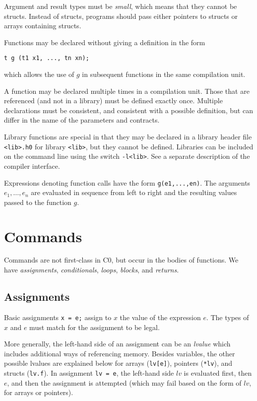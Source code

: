 \documentclass[11pt]{article}
\begin{document}
Argument and result types must be \emph{small}, which means that
they cannot be structs.  Instead of structs, programs should
pass either pointers to structs or arrays containing structs.

Functions may be declared without giving a definition in the form
\begin{lstlisting}
t g (t1 x1, ..., tn xn);
\end{lstlisting}
which allows the use of $g$ in subsequent functions in the same
compilation unit.

A function may be declared multiple times in a compilation unit.
Those that are referenced (and not in a library) must be defined
exactly once.  Multiple declarations must be consistent, and
consistent with a possible definition, but can differ in the name of
the parameters and contracts.

Library functions are special in that they may be declared in
a library header file \lstinline'<lib>.h0' for library \lstinline'<lib>', but
they cannot be defined.  Libraries can be included on the
command line using the switch \lstinline'-l<lib>'.  See a separate
description of the compiler interface.

Expressions denoting function calls have the form \lstinline'g(e1,...,en)'.
The arguments $e_1, \ldots, e_n$ are evaluated in sequence from
left to right and the resulting values passed to the function $g$.

\section{Commands}

Commands are not first-class in C0, but occur in the bodies
of functions.  We have \emph{assignments}, \emph{conditionals},
\emph{loops}, \emph{blocks}, and \emph{returns}.

\subsection{Assignments}

Basic assignments \lstinline'x = e;' assign to $x$ the value
of the expression $e$.  The types of $x$ and $e$ must match
for the assignment to be legal.

More generally, the left-hand side of an assignment can be an
\emph{lvalue} which includes additional ways of referencing memory.
Besides variables, the other possible lvalues are explained below for
arrays (\lstinline'lv[e]'), pointers (\lstinline'*lv'), and structs
(\lstinline'lv.f').  In assignment \lstinline'lv = e', the left-hand side
$lv$ is evaluated first, then $e$, and then the assignment is
attempted (which may fail based on the form of $lv$, for arrays
or pointers).
\end{document}
